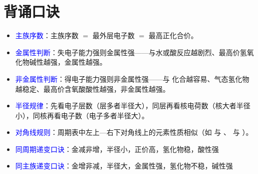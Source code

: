     \section{背诵口诀}\label{app:周期表-口诀}

        \begin{itemize}
            \item \textcolor{blue}{主族序数}：主族序数 \(=\) 最外层电子数 \(=\) 最高正化合价。
            \item \textcolor{blue}{金属性判断}：失电子能力强则金属性强——与水或酸反应越剧烈、最高价氢氧化物碱性越强，金属性越强。
            \item \textcolor{blue}{非金属性判断}：得电子能力强则非金属性强——与  化合越容易、气态氢化物越稳定、最高价含氧酸酸性越强，非金属性越强。
            \item \textcolor{blue}{半径规律}：先看电子层数（层多者半径大），同层再看核电荷数（核大者半径小），同核再看电子数（电子多者半径大）。
            \item \textcolor{blue}{对角线规则}：周期表中左上—右下对角线上的元素性质相似（如  与 、 与 ）。
            \item \textcolor{blue}{同周期递变口诀}：金减非增，半径小，正价高，氢化物稳，酸性强
            \item \textcolor{blue}{同主族递变口诀}：金增非减，半径大，金属性强，氢化物不稳，碱性强
        \end{itemize}
